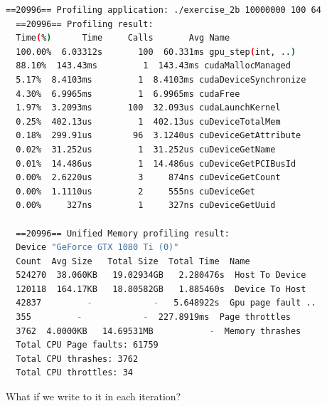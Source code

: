 \documentclass{article}
\begin{document}
\begin{mdframed}[backgroundcolor=codeColor,leftmargin=0.0cm,hidealllines=true,%
  innerleftmargin=0.1cm,innerrightmargin=0.1cm,innertopmargin=0.5cm,innerbottommargin=0.10cm,
  roundcorner=15pt]
  \begin{lstlisting}[language=bash]
  ==20996== Profiling application: ./exercise_2b 10000000 100 64
  ==20996== Profiling result:
  Time(%)      Time     Calls       Avg Name
  100.00%  6.03312s       100  60.331ms gpu_step(int, ..)
  88.10%  143.43ms         1  143.43ms cudaMallocManaged
  5.17%  8.4103ms         1  8.4103ms cudaDeviceSynchronize
  4.30%  6.9965ms         1  6.9965ms cudaFree
  1.97%  3.2093ms       100  32.093us cudaLaunchKernel
  0.25%  402.13us         1  402.13us cuDeviceTotalMem
  0.18%  299.91us        96  3.1240us cuDeviceGetAttribute
  0.02%  31.252us         1  31.252us cuDeviceGetName
  0.01%  14.486us         1  14.486us cuDeviceGetPCIBusId
  0.00%  2.6220us         3     874ns cuDeviceGetCount
  0.00%  1.1110us         2     555ns cuDeviceGet
  0.00%     327ns         1     327ns cuDeviceGetUuid

  ==20996== Unified Memory profiling result:
  Device "GeForce GTX 1080 Ti (0)"
  Count  Avg Size   Total Size  Total Time  Name
  524270  38.060KB   19.02934GB   2.280476s  Host To Device
  120118  164.17KB   18.80582GB   1.885460s  Device To Host
  42837         -            -   5.648922s  Gpu page fault ..
  355         -            -  227.8919ms  Page throttles
  3762  4.0000KB   14.69531MB           -  Memory thrashes
  Total CPU Page faults: 61759
  Total CPU thrashes: 3762
  Total CPU throttles: 34
  \end{lstlisting}
\end{mdframed}

What if we write to it in each iteration?

\newpage 
\end{document}
